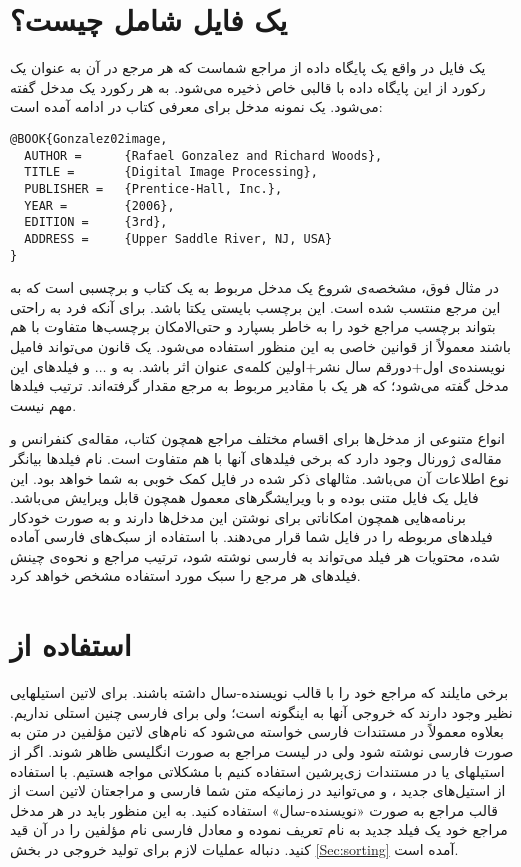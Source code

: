 \documentclass{article}
\theoremstyle{plain}\newtheorem{question}{پرسش}
\begin{document}
\section{یک فایل  شامل چیست؟}
یک فایل  در واقع یک پایگاه داده از مراجع  شماست که هر مرجع در آن به عنوان یک رکورد از این پایگاه داده
با قالبی خاص ذخیره می‌شود. به هر رکورد یک مدخل گفته می‌شود. یک نمونه مدخل برای معرفی کتاب  در ادامه آمده است:
\begin{LTR}
\begin{verbatim}
@BOOK{Gonzalez02image,
  AUTHOR =      {Rafael Gonzalez and Richard Woods},
  TITLE =       {Digital Image Processing},
  PUBLISHER =   {Prentice-Hall, Inc.},
  YEAR =        {2006},
  EDITION =     {3rd},
  ADDRESS =     {Upper Saddle River, NJ, USA}
}
\end{verbatim}
\end{LTR}
در مثال فوق،  مشخصه‌ی شروع یک مدخل مربوط به یک کتاب و  برچسبی است که به این مرجع منتسب شده است.
 این برچسب بایستی یکتا باشد. برای آنکه فرد به راحتی بتواند برچسب
مراجع خود را به خاطر بسپارد و حتی‌الامکان برچسب‌ها متفاوت با هم باشند معمولاً از قوانین خاصی به این منظور استفاده می‌شود. یک قانون می‌تواند فامیل نویسنده‌ی
اول+دورقم سال نشر+اولین کلمه‌ی عنوان اثر باشد. به  و $\dots$ و  فیلدهای این مدخل گفته می‌شود؛ که هر یک با مقادیر مربوط
به مرجع مقدار گرفته‌اند. ترتیب فیلدها مهم نیست. 

انواع متنوعی از مدخل‌ها برای اقسام مختلف مراجع همچون کتاب، مقاله‌ی کنفرانس و مقاله‌ی ژورنال وجود دارد که برخی فیلدهای آنها با هم متفاوت است. 
نام فیلدها بیانگر نوع اطلاعات آن می‌باشد. مثالهای ذکر شده در فایل  کمک خوبی به شما خواهد بود. 
این فایل یک فایل متنی بوده و با ویرایشگرهای معمول همچون  قابل ویرایش می‌باشد. برنامه‌هایی همچون 
 امکاناتی برای نوشتن این مدخل‌ها دارند و به صورت خودکار فیلدهای مربوطه را در فایل   شما قرار می‌دهند.  
با استفاده از سبک‌های فارسی آماده شده، محتویات هر فیلد می‌تواند به فارسی نوشته شود، ترتیب مراجع و نحوه‌ی چینش فیلدهای هر مرجع را سبک مورد استفاده 
مشخص خواهد کرد.


\section{استفاده از }\label{Sec:natbib}
برخی مایلند که مراجع خود را با قالب نویسنده-سال داشته باشند. برای لاتین استیلهایی نظیر  وجود دارند که خروجی آنها به اینگونه است؛ ولی برای فارسی چنین استلی نداریم. 
بعلاوه معمولاً در مستندات فارسی خواسته می‌شود که نام‌های لاتین مؤلفین در متن به صورت فارسی نوشته شود ولی در لیست مراجع به صورت انگلیسی ظاهر شوند. اگر از استیلهای  یا  در مستندات زی‌پرشین استفاده کنیم با مشکلاتی مواجه هستیم. 
با استفاده از استیل‌های جدید ،   و  می‌توانید در زمانیکه متن شما فارسی و مراجعتان لاتین است از قالب مراجع به صورت «نویسنده-سال» استفاده کنید. به این منظور باید در هر مدخل مراجع خود یک فیلد جدید به نام  تعریف نموده و معادل فارسی نام مؤلفین را در آن قید کنید. 
دنباله عملیات لازم برای تولید خروجی در بخش \ref{Sec:sorting} آمده است.
\end{document}

